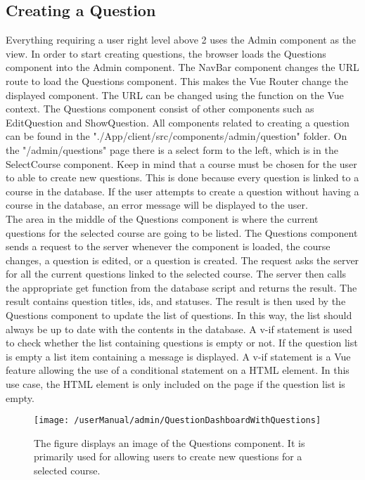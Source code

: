 \subsection{Creating a Question}
Everything requiring a user right level above 2 uses the Admin component as the view.  In order to start creating questions, the browser loads the Questions component into the Admin component. 
The NavBar component changes the URL route to load the Questions component. This makes the Vue Router change the displayed component. The URL can be changed using the  function on the Vue context. The Questions component consist of other components such as EditQuestion and ShowQuestion. All components related to creating a question can be found in the "./App/client/src/components/admin/question" folder. On the "/admin/questions" page there is a select form to the left, which is in the SelectCourse component. Keep in mind that a course must be chosen for the user to able to create new questions. This is done because every question is linked to a course in the database.  If the user attempts to create a question without having a course in the database, an error message will be displayed to the user.
\\[11pt]
The area in the middle of the Questions component is where the current questions for the selected course are going to be listed. The Questions component sends a request to the server whenever the component is loaded, the course changes, a question is edited, or a question is created. The request asks the server for all the current questions linked to the selected course. The server then calls the appropriate get function from the database script and returns the result. The result contains question titles, ids, and statuses. The result is then used by the Questions component to update the list of questions. In this way, the list should always be up to date with the contents in the database. A v-if statement is used to check whether the list containing questions is empty or not. If the question list is empty a list item containing a message is displayed. A v-if statement is a Vue feature allowing the use of a conditional statement on a HTML element. In this use case, the HTML element is only included on the page if the question list is empty.
\begin{figure}[H]
    \centering
    \texttt{[image: /userManual/admin/QuestionDashboardWithQuestions]}
    \caption{The figure displays an image of the Questions component. It is primarily used for allowing users to create new questions for a selected course. }
    \label{fig:questionVue}
\end{figure}
